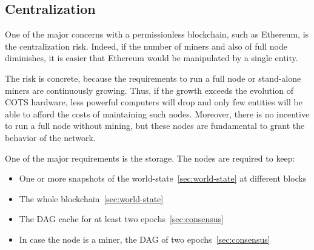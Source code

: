 \subsection{Centralization}

One of the major concerns with a permissionless blockchain, such as Ethereum,
is the centralization risk. Indeed, if the number of miners and also of full
node diminishes, it is easier that Ethereum would be manipulated by a single
entity.

The risk is concrete, because the requirements to run a full node or 
stand-alone miners are continuously growing. Thus, if the growth exceeds the
evolution of COTS hardware, less powerful computers will drop and only few
entities will be able to afford the costs of maintaining such nodes. Moreover, 
there is no incentive to run a full node without mining, but these nodes are 
fundamental to grant the behavior of the network.

One of the major requirements is the storage. The nodes are required to keep:
\begin{itemize}
    \item One or more snapshots of the world-state~\autoref{sec:world-state}
    at different blocks
    \item The whole blockchain~\autoref{sec:world-state}
    \item The DAG cache for at least two epochs~\autoref{sec:consensus}
    \item In case the node is a miner, the DAG of two 
    epochs~\autoref{sec:consensus}
\end{itemize}


